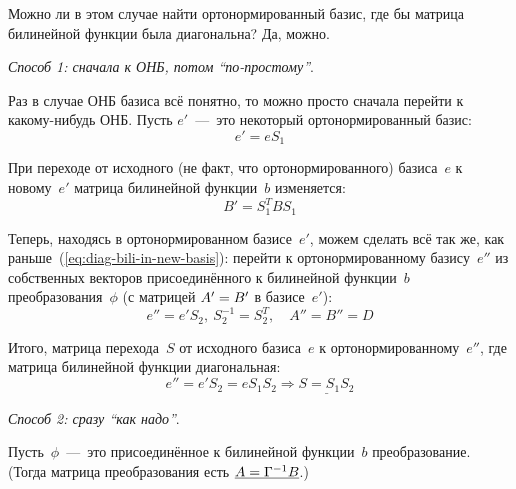 \documentclass[a4paper,12pt]{article}
\theoremstyle{remark}
\begin{document}
  Можно ли в этом случае найти ортонормированный базис, где бы матрица билинейной функции была диагональна?
  Да, можно.
  
  \medskip
  
  \emph{Способ 1: сначала к ОНБ, потом ``по-простому''}.
  
  Раз в случае ОНБ базиса всё понятно, то можно просто сначала перейти к какому-нибудь ОНБ.
  Пусть $e'$~---~это некоторый ортонормированный базис:
  \[
    e' = e S_1
  \]
  
  При переходе от исходного (не факт, что ортонормированного) базиса~$e$ к новому~$e'$ матрица билинейной функции~$b$ изменяется:
  \[
    B' = S_1^T B S_1
  \]
  
  Теперь, находясь в ортонормированном базисе~$e'$, можем сделать всё так же, как раньше~(\ref{eq:diag-bili-in-new-basis}): перейти к ортонормированному базису~$e''$ из собственных векторов присоединённого к билинейной функции~$b$ преобразования~$\phi$ (с матрицей $A' \hm= B'$ в базисе~$e'$):
  \[
    e'' = e' S_2,\ S_2^{-1} = S_2^T,\quad A'' = B'' = D
  \]
  
  Итого, матрица перехода~$S$ от исходного базиса~$e$ к ортонормированному~$e''$, где матрица билинейной функции диагональная:
  \[
    e'' = e' S_2 = e S_1 S_2 \Rightarrow \underline{S = S_1 S_2}
  \]
  
  \medskip
  
  \emph{Способ 2: сразу ``как надо''}.
  
  Пусть~$\phi$~---~это присоединённое к билинейной функции~$b$ преобразование.
  (Тогда матрица преобразования есть $\underline{A \hm= \Gamma^{-1} B}$.)
  
\end{document}

